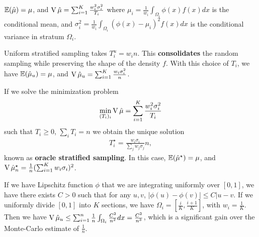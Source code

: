 \begin{thm}
  \label{sec:monte-carlo-method-7}
  $\E{\hat \mu} = \mu$, and $\operatorname*{V} \hat \mu = \sum_{i=1}^{K}
  \frac{w_{i}^{2} \sigma^{2}_{i}}{T_{i}} $ where $\mu_{i} =
  \frac{1}{w_{i}} \int_{\Omega_{i}} \phi(x) f(x) dx$ is the
  conditional mean, and $\sigma^{2}_{i} = \frac{1}{w_{i}}
  \int_{\Omega_{i}}^{} (\phi(x) - \mu_{i})^{2} f(x) dx $ is the
  conditional variance in stratum $\Omega_{i}$.
\end{thm}

\begin{defn}
  \label{sec:monte-carlo-method-8}
  Uniform stratified sampling takes $T_{i}^{u} = w_{i} n$.  This
  \textbf{consolidates} the random sampling while preserving the shape
  of the density $f$.  With this choice of $T_{i}$, we have $\E{\hat
    \mu_{u}} = \mu$, and $\operatorname*{V} \hat \mu_{u} = \sum_{i=1}^{K} \frac{w_{i}
  \sigma_{i}^{2}}{n}$.
\end{defn}

\begin{thm}
  \label{sec:monte-carlo-method-9}
  If we solve the minimization problem
  \begin{align}
    \label{eq:5}
    \min_{(T_{i})_{i}} \operatorname*{V} \hat \mu = \sum_{i=1}^{K} \frac{w_{i}^{2}
      \sigma_{i}^{2}}{T_{i}}
  \end{align} such that $T_{i} \geq 0$, $\sum_{i}^{} T_{i} = n$
  we obtain the unique solution
  \begin{align}
    \label{eq:6}
    T_{i}^{\star} = \frac{w_{i} \sigma_{i}}{\sum_{j}^{} w_{j}
      \sigma_{j}} n, 
  \end{align} known as \textbf{oracle stratified sampling}.  In this
  case, $\E{\hat \mu^{\star}} = \mu$, and $\operatorname*{V} \hat \mu^{\star}_{n} =
  \frac{1}{n} (\sum_{i=1}^{K} w_{i} \sigma_{i})^{2}$.
\end{thm}

\begin{thm}
  \label{sec:monte-carlo-method-10}
  If we have Lipschitz function $\phi$ that we are integrating uniformly
  over $[0, 1]$, we have there exists $C > 0$ such that for any $u,
  v$, $|\phi(u) - \phi(v)| \leq C |u - v$.  If we uniformly divide
  $[0, 1]$ into $K$ sections, we have $\Omega_{i} = [\frac{i}{K},
  \frac{i+1}{K}]$, with $w_{i} = \frac{1}{K}$.  Then we have $\operatorname*{V} \hat
  \mu_{u} \leq \sum_{i=1}^{n} \frac{1}{n} \int_{\Omega_{i}}^{}
  \frac{C^{2}}{n^{2}} dx = \frac{C^{2}}{n^{3}}$, which is a significant
  gain over the Monte-Carlo estimate of $\frac{1}{n}$.
\end{thm}


